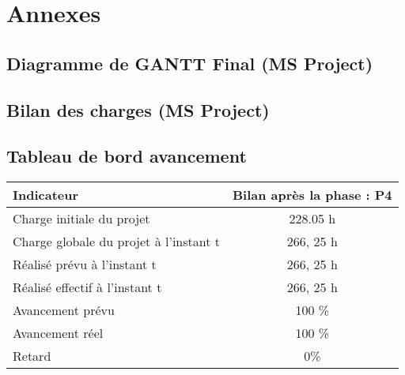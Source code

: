 \section{Annexes}

    \subsection{Diagramme de GANTT Final (MS Project)}
        

    \subsection{Bilan des charges (MS Project)}
        
    \subsection{Tableau de bord avancement}
        \begin{tabular}{l c}
            \textbf{Indicateur} & \textbf{Bilan après la phase : P4} \\
            \hline
            Charge initiale du projet & 228.05 h \\
            Charge globale du projet à l’instant t & 266, 25 h \\
            Réalisé prévu à l’instant t & 266, 25 h \\
            Réalisé effectif à l’instant t & 266, 25 h \\
            Avancement prévu & 100 \% \\
            Avancement réel & 100 \% \\
            Retard & 0\% \\
        \end{tabular}





